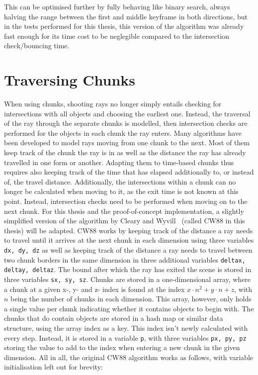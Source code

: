 This can be optimised further by fully behaving like binary search,
always halving the range between the first and middle keyframe in both directions,
but in the tests performed for this thesis,
this version of the algorithm was already fast enough for its time cost to be neglegible
compared to the intersection check/bouncing time.

\section{Traversing Chunks}

When using chunks, shooting rays no longer simply entails checking for intersections with all objects and choosing the earliest one.
Instead, the traversal of the ray through the separate chunks is modelled,
then intersection checks are performed for the objects in each chunk the ray enters.
\newline
Many algorithms have been developed to model rays moving from one chunk to the next.
Most of them keep track of the chunk the ray is in as well as the distance the ray has already travelled in one form or another.
Adapting them to time-based chunks thus requires also keeping track of the time that has elapsed additionally to,
or instead of, the travel distance.
Additionally, the intersections within a chunk can no longer be calculated when moving to it,
as the exit time is not known at this point.
Instead, intersection checks need to be performed when moving on to the next chunk.
\newline
For this thesis and the proof-of-concept implementation,
a slightly simplified version of the algorithm by Cleary and Wyvill~\cite{CW88} (called CW88 in this thesis) will be adapted.
\newline
CW88 works by keeping track of the distance a ray needs to travel until it arrives at the next chunk in each dimension
using three variables \verb|dx, dy, dz|
as well as keeping track of the distance a ray needs to travel between two chunk borders in the same dimension
in three additional variables \verb|deltax, deltay, deltaz|.
The bound after which the ray has exited the scene is stored in three variables \verb|sx, sy, sz|.
\newline
Chunks are stored in a one-dimensional array,
where a chunk at a given x-, y- and z- index is found at the index \(x \cdot n^2 + y \cdot n + z\),
with \(n\) being the number of chunks in each dimension.
This array, however, only holds a single value per chunk indicating whether it contains objects to begin with.
The chunks that do contain objects are stored in a hash map or similar data structure,
using the array index as a key.
\newline
This index isn't newly calculated with every step.
Instead, it is stored in a variable \verb|p|,
with three variables \verb|px, py, pz| storing the value to add to the index when entering a new chunk in the given dimension.
\newline
All in all, the original CW88 algorithm works as follows, with variable initialisation left out for brevity:

